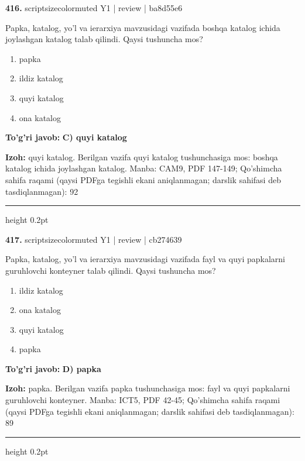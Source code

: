 \documentclass[10pt,a4paper]{article}
\begin{document}
{\bfseries\sffamily\color{ink} 416.} {scriptsizecolor{muted} Y1 | review | ba8d55e6}
\par
Papka, katalog, yo'l va ierarxiya mavzusidagi vazifada boshqa katalog ichida joylashgan katalog talab qilindi. Qaysi tushuncha mos?
\begin{enumerate}[label=\Alph*),leftmargin=9mm]
\item papka
\item ildiz katalog
\item quyi katalog
\item ona katalog
\end{enumerate}
\begin{tcolorbox}[enhanced,breakable,colback=teal!4,colframe=teal!60!black,boxrule=0.45pt,arc=1.2mm,left=2.7mm,right=2.7mm,top=1.8mm,bottom=1.8mm,before skip=2mm,after skip=2mm]
{\bfseries\sffamily\color{teal}To'g'ri javob:} \textbf{C) quyi katalog}
\par\smallskip
{\bfseries Izoh:} quyi katalog. Berilgan vazifa quyi katalog tushunchasiga mos: boshqa katalog ichida joylashgan katalog. Manba: CAM9, PDF 147-149; Qo'shimcha sahifa raqami (qaysi PDFga tegishli ekani aniqlanmagan; darslik sahifasi deb tasdiqlanmagan): 92
\end{tcolorbox}
\vspace{2mm}\hrule height 0.2pt\vspace{3mm}

{\bfseries\sffamily\color{ink} 417.} {scriptsizecolor{muted} Y1 | review | cb274639}
\par
Papka, katalog, yo'l va ierarxiya mavzusidagi vazifada fayl va quyi papkalarni guruhlovchi konteyner talab qilindi. Qaysi tushuncha mos?
\begin{enumerate}[label=\Alph*),leftmargin=9mm]
\item ildiz katalog
\item ona katalog
\item quyi katalog
\item papka
\end{enumerate}
\begin{tcolorbox}[enhanced,breakable,colback=teal!4,colframe=teal!60!black,boxrule=0.45pt,arc=1.2mm,left=2.7mm,right=2.7mm,top=1.8mm,bottom=1.8mm,before skip=2mm,after skip=2mm]
{\bfseries\sffamily\color{teal}To'g'ri javob:} \textbf{D) papka}
\par\smallskip
{\bfseries Izoh:} papka. Berilgan vazifa papka tushunchasiga mos: fayl va quyi papkalarni guruhlovchi konteyner. Manba: ICT5, PDF 42-45; Qo'shimcha sahifa raqami (qaysi PDFga tegishli ekani aniqlanmagan; darslik sahifasi deb tasdiqlanmagan): 89
\end{tcolorbox}
\vspace{2mm}\hrule height 0.2pt\vspace{3mm}
\end{document}
